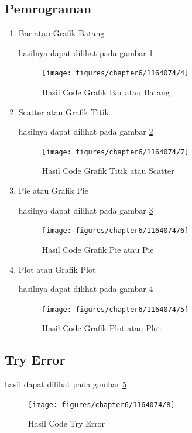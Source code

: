 \subsection{Pemrograman}
\begin{enumerate}
\item Bar atau Grafik Batang

\par hasilnya dapat dilihat pada gambar \ref{data4}
\begin{figure} [!htbp]
	\centerline{\texttt{[image: figures/chapter6/1164074/4]}}
	\caption{Hasil Code Grafik Bar atau Batang}
	\label{data4}
\end{figure}

\item Scatter atau Grafik Titik

\par hasilnya dapat dilihat pada gambar \ref{data5}
\begin{figure} [!htbp]
	\centerline{\texttt{[image: figures/chapter6/1164074/7]}}
	\caption{Hasil Code Grafik Titik atau Scatter}
	\label{data5}
\end{figure}

\item Pie atau Grafik Pie

\par hasilnya dapat dilihat pada gambar \ref{data6}
\begin{figure} [!htbp]
	\centerline{\texttt{[image: figures/chapter6/1164074/6]}}
	\caption{Hasil Code Grafik Pie atau Pie}
	\label{data6}
\end{figure}

\item Plot atau Grafik Plot 

\par hasilnya dapat dilihat pada gambar \ref{data7}
\begin{figure} [!htbp]
	\centerline{\texttt{[image: figures/chapter6/1164074/5]}}
	\caption{Hasil Code Grafik Plot atau Plot}
	\label{data7}
\end{figure}

\end{enumerate}
\subsection{Try Error}

\par hasil dapat dilihat pada gambar \ref{data8}
\begin{figure} [!htbp]
	\centerline{\texttt{[image: figures/chapter6/1164074/8]}}
	\caption{Hasil Code Try Error}
	\label{data8}
\end{figure}

